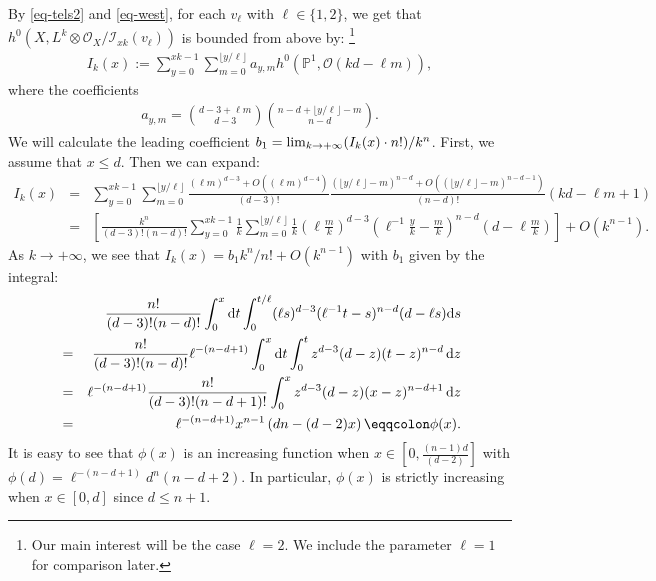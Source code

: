 \documentclass[12pt]{amsart}
\theoremstyle{definition}
\def\lim{{\rm lim}}
\def\dif{{\rm d}}
\newcommand{\IP}{{\mathbb P}}
\newcommand{\CI}{{\mathcal I}}
\newcommand{\CO}{{\mathcal O}}
\begin{document}
By \eqref{eq-tels2} and \eqref{eq-west}, for each $v_\ell$ with $\ell\in \{1,2\}$, we get that $h^0(X, L^k\otimes \CO_X/\CI_{xk}(v_\ell))$ is bounded from above by: \footnote{Our main interest will be the case $\ell=2$. We include the parameter $\ell=1$ for comparison later. }
\begin{eqnarray*}
I_k(x):=\sum_{y=0}^{xk-1}\sum_{m=0}^{\lfloor y/\ell\rfloor}a_{y,m}h^0(\IP^1, \CO(kd-\ell m)),
\end{eqnarray*}
where the coefficients 
\begin{eqnarray*}
    a_{y,m}=\binom{d-3+\ell m}{d-3}\binom{n-d+\lfloor y/\ell\rfloor-m}{n-d}.
\end{eqnarray*}
We will calculate the leading coefficient $b_1=\lim_{k\rightarrow +\infty} (I_k(x)\cdot n!)/k^n$. 
First, we assume that $x\le d$. Then we can expand:
\begin{eqnarray*}
I_k(x)&=&\sum_{y=0}^{xk-1}\sum_{m=0}^{\lfloor y/\ell\rfloor}\frac{(\ell m)^{d-3}+O((\ell m)^{d-4})}{(d-3)!}\frac{(\lfloor y/\ell \rfloor -m)^{n-d}+O((\lfloor y/\ell\rfloor -m)^{n-d-1})}{(n-d)!}(kd-\ell m+1)\\
&=&\left[\frac{k^n}{(d-3)!(n-d)!}\sum_{y=0}^{xk-1}\frac{1}{k}\sum_{m=0}^{
\lfloor y/\ell\rfloor}\frac{1}{k} (\ell \frac{m}{k})^{d-3}(\ell^{-1}\frac{y}{k}-\frac{m}{k})^{n-d}(d-\ell \frac{m}{k})\right]+O(k^{n-1}).
\end{eqnarray*}
As $k\rightarrow+\infty$, we see that $I_k(x)=b_1 k^n/n!+O(k^{n-1})$ with $b_1$ given by the integral:
\begin{eqnarray}\label{eq-phiint}
    &&\frac{n!}{(d-3)!(n-d)!}\int_0^x \dif t \int_0^{t/\ell} (\ell s)^{d-3}(\ell^{-1}t-s)^{n-d}(d-\ell s) \dif s\nonumber \\
    &=&\frac{n!}{(d-3)!(n-d)!}\ell^{-(n-d+1)}\int^{x}_0\dif t \int_0^{t}  z^{d-3}(d-z)(t-z)^{n-d} \,\dif z\nonumber \\
    &=&\ell^{-(n-d+1)} \frac{n!}{(d-3)!(n-d+1)!}\int_0^x z^{d-3} (d-z)(x-z)^{n-d+1}\, \dif z\nonumber \\
    &=& \ell^{-(n-d+1)} x^{n-1}\left(dn-(d-2)x\right)\eqqcolon\phi(x).
\end{eqnarray}
It is easy to see that $\phi(x)$ is an increasing function when $x\in [0, \frac{(n-1)d}{(d-2)}]$ with $\phi(d)=\ell^{-(n-d+1)}d^{n}(n-d+2)$. In particular, $\phi(x)$ is strictly increasing when $x \in [0,d]$ since $d\le n+1$.
\end{document}
